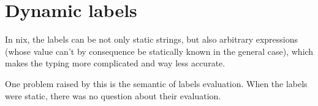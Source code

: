 \documentclass{article}
\begin{document}
\section{Dynamic labels}

In nix, the labels can be not only static strings, but also arbitrary
expressions (whose value can't by consequence be statically known in the
general case), which makes the typing more complicated and way less accurate.

One problem raised by this is the semantic of labels evaluation. When the
labels were static, there was no question about their evaluation.



\end{document}
